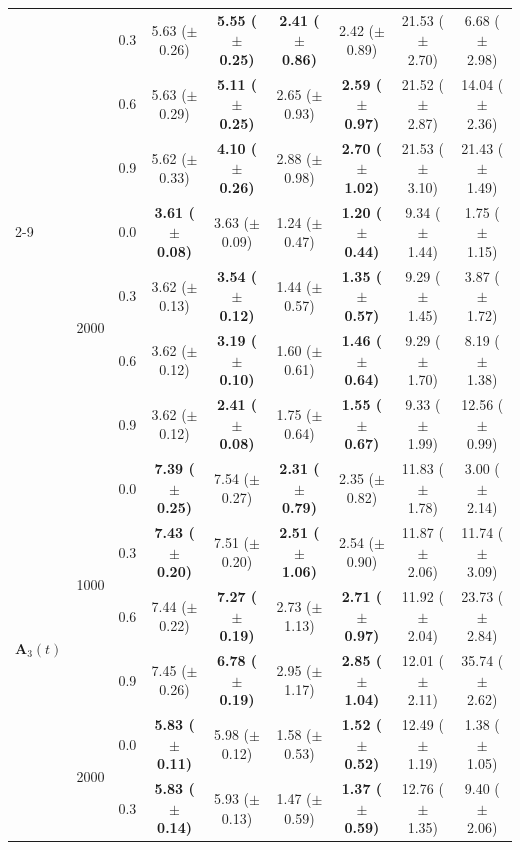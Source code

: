 \begin{table}[htbp]
{\begin{tabular}{lll|cc|cc|cc}
 &  & 0.3 & 5.63 ($\pm$ 0.26) & \textbf{5.55 ($\pm$ 0.25)} & \textbf{2.41 ($\pm$ 0.86)} & 2.42 ($\pm$ 0.89) & 21.53 ($\pm$ 2.70) & 6.68 ($\pm$ 2.98) \\
 &  & 0.6 & 5.63 ($\pm$ 0.29) & \textbf{5.11 ($\pm$ 0.25)} & 2.65 ($\pm$ 0.93) & \textbf{2.59 ($\pm$ 0.97)} & 21.52 ($\pm$ 2.87) & 14.04 ($\pm$ 2.36) \\
 &  & 0.9 & 5.62 ($\pm$ 0.33) & \textbf{4.10 ($\pm$ 0.26)} & 2.88 ($\pm$ 0.98) & \textbf{2.70 ($\pm$ 1.02)} & 21.53 ($\pm$ 3.10) & 21.43 ($\pm$ 1.49) \\
\cline{2-9}
 & \multirow{4}{*}{2000} & 0.0 & \textbf{3.61 ($\pm$ 0.08)} & 3.63 ($\pm$ 0.09) & 1.24 ($\pm$ 0.47) & \textbf{1.20 ($\pm$ 0.44)} & 9.34 ($\pm$ 1.44) & 1.75 ($\pm$ 1.15) \\
 &  & 0.3 & 3.62 ($\pm$ 0.13) & \textbf{3.54 ($\pm$ 0.12)} & 1.44 ($\pm$ 0.57) & \textbf{1.35 ($\pm$ 0.57)} & 9.29 ($\pm$ 1.45) & 3.87 ($\pm$ 1.72) \\
 &  & 0.6 & 3.62 ($\pm$ 0.12) & \textbf{3.19 ($\pm$ 0.10)} & 1.60 ($\pm$ 0.61) & \textbf{1.46 ($\pm$ 0.64)} & 9.29 ($\pm$ 1.70) & 8.19 ($\pm$ 1.38) \\
 &  & 0.9 & 3.62 ($\pm$ 0.12) & \textbf{2.41 ($\pm$ 0.08)} & 1.75 ($\pm$ 0.64) & \textbf{1.55 ($\pm$ 0.67)} & 9.33 ($\pm$ 1.99) & 12.56 ($\pm$ 0.99) \\
\hline
\multirow{8}{*}{$\mathbf{A}_3(t)$} & \multirow{4}{*}{1000} & 0.0 & \textbf{7.39 ($\pm$ 0.25)} & 7.54 ($\pm$ 0.27) & \textbf{2.31 ($\pm$ 0.79)} & 2.35 ($\pm$ 0.82) & 11.83 ($\pm$ 1.78) & 3.00 ($\pm$ 2.14) \\
 &  & 0.3 & \textbf{7.43 ($\pm$ 0.20)} & 7.51 ($\pm$ 0.20) & \textbf{2.51 ($\pm$ 1.06)} & 2.54 ($\pm$ 0.90) & 11.87 ($\pm$ 2.06) & 11.74 ($\pm$ 3.09) \\
 &  & 0.6 & 7.44 ($\pm$ 0.22) & \textbf{7.27 ($\pm$ 0.19)} & 2.73 ($\pm$ 1.13) & \textbf{2.71 ($\pm$ 0.97)} & 11.92 ($\pm$ 2.04) & 23.73 ($\pm$ 2.84) \\
 &  & 0.9 & 7.45 ($\pm$ 0.26) & \textbf{6.78 ($\pm$ 0.19)} & 2.95 ($\pm$ 1.17) & \textbf{2.85 ($\pm$ 1.04)} & 12.01 ($\pm$ 2.11) & 35.74 ($\pm$ 2.62) \\
\cline{2-9}
 & \multirow{4}{*}{2000} & 0.0 & \textbf{5.83 ($\pm$ 0.11)} & 5.98 ($\pm$ 0.12) & 1.58 ($\pm$ 0.53) & \textbf{1.52 ($\pm$ 0.52)} & 12.49 ($\pm$ 1.19) & 1.38 ($\pm$ 1.05) \\
 &  & 0.3 & \textbf{5.83 ($\pm$ 0.14)} & 5.93 ($\pm$ 0.13) & 1.47 ($\pm$ 0.59) & \textbf{1.37 ($\pm$ 0.59)} & 12.76 ($\pm$ 1.35) & 9.40 ($\pm$ 2.06) \\

\end{tabular}}
\end{table}
